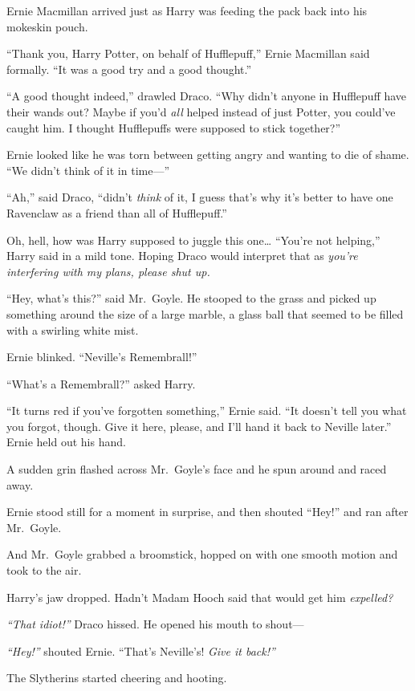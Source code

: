 Ernie Macmillan arrived just as Harry was feeding the pack back into his
mokeskin pouch.

``Thank you, Harry Potter, on behalf of Hufflepuff,'' Ernie Macmillan
said formally. ``It was a good try and a good thought.''

``A good thought indeed,'' drawled Draco. ``Why didn't anyone in
Hufflepuff have their wands out? Maybe if you'd \emph{all} helped
instead of just Potter, you could've caught him. I thought Hufflepuffs
were supposed to stick together?''

Ernie looked like he was torn between getting angry and wanting to die
of shame. ``We didn't think of it in time---''

``Ah,'' said Draco, ``didn't \emph{think} of it, I guess that's why it's
better to have one Ravenclaw as a friend than all of Hufflepuff.''

Oh, hell, how was Harry supposed to juggle this one\ldots{} ``You're not
helping,'' Harry said in a mild tone. Hoping Draco would interpret that
as \emph{you're interfering with my plans, please shut up.}

``Hey, what's this?'' said Mr.~Goyle. He stooped to the grass and picked
up something around the size of a large marble, a glass ball that seemed
to be filled with a swirling white mist.

Ernie blinked. ``Neville's Remembrall!''

``What's a Remembrall?'' asked Harry.

``It turns red if you've forgotten something,'' Ernie said. ``It doesn't
tell you what you forgot, though. Give it here, please, and I'll hand it
back to Neville later.'' Ernie held out his hand.

A sudden grin flashed across Mr.~Goyle's face and he spun around and
raced away.

Ernie stood still for a moment in surprise, and then shouted ``Hey!''
and ran after Mr.~Goyle.

And Mr.~Goyle grabbed a broomstick, hopped on with one smooth motion and
took to the air.

Harry's jaw dropped. Hadn't Madam Hooch said that would get him
\emph{expelled?}

\emph{``That idiot!''} Draco hissed. He opened his mouth to shout---

\emph{``Hey!''} shouted Ernie. ``That's Neville's! \emph{Give it
back!''}

The Slytherins started cheering and hooting.

